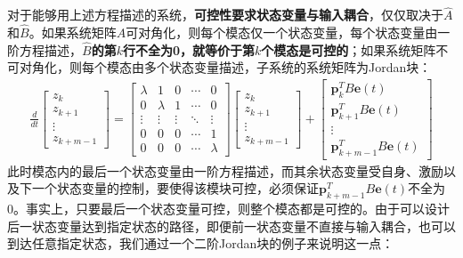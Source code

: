 对于能够用上述方程描述的系统，\textbf{可控性要求状态变量与输入耦合}，仅仅取决于$\hat{A}$和$\hat{B}$。如果系统矩阵$A$可对角化，则每个模态仅一个状态变量，每个状态变量由一阶方程描述，\textbf{$\hat{B}$的第$k$行不全为0，就等价于第$k$个模态是可控的}；如果系统矩阵不可对角化，则每个模态由多个状态变量描述，子系统的系统矩阵为Jordan块：
\begin{align*}
    \frac{d}{dt}\begin{bmatrix}
    z_k\\
    z_{k+1}\\
    \vdots\\
    z_{k+m-1}
    \end{bmatrix}=\begin{bmatrix}
    \lambda & 1 & 0 & \cdots & 0\\
    0 & \lambda & 1 & \cdots & 0\\
    \vdots & \vdots & \vdots & \ddots & \vdots\\
    0 & 0 & 0 & \cdots & 1\\
    0 & 0 & 0 & \cdots & \lambda
    \end{bmatrix}\begin{bmatrix}
    z_k\\
    z_{k+1}\\
    \vdots\\
    z_{k+m-1}
    \end{bmatrix}+\begin{bmatrix}
    \mathbf{p}_k^T B\mathbf{e}(t)\\
    \mathbf{p}_{k+1}^T B\mathbf{e}(t)\\
    \vdots\\
    \mathbf{p}_{k+m-1}^T B\mathbf{e}(t)
    \end{bmatrix}
\end{align*}
此时模态内的最后一个状态变量由一阶方程描述，而其余状态变量受自身、激励以及下一个状态变量的控制，要使得该模块可控，必须保证$\mathbf{p}_{k+m-1}^T B\mathbf{e}(t)$不全为0。事实上，只要最后一个状态变量可控，则整个模态都是可控的。由于可以设计后一状态变量达到指定状态的路径，即便前一状态变量不直接与输入耦合，也可以到达任意指定状态，我们通过一个二阶Jordan块的例子来说明这一点：
